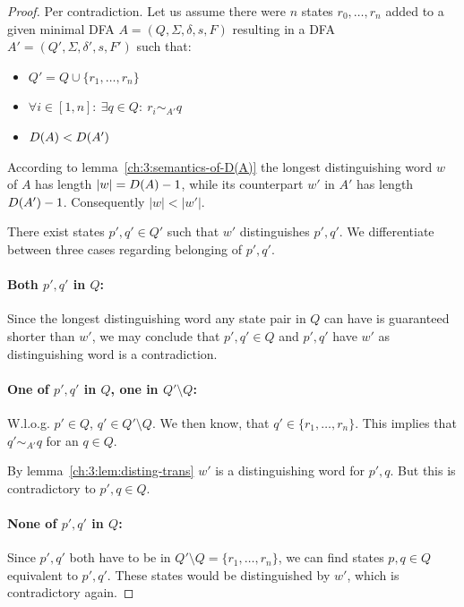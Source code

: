 \begin{proof}
	Per contradiction. Let us assume there were $n$ states $r_0, \ldots, r_n$ added to a given minimal DFA $A = (Q, \Sigma, \delta, s, F)$ resulting in a DFA $A' = (Q', \Sigma, \delta', s, F')$ such that:
	\begin{itemize}
		\item $Q' = Q \cup \{ r_1, \ldots, r_n \}$
		\item $\forall i \in [1,n] \colon\ \exists q \in Q\colon\ r_i \sim_{A'} q$
        \item $D(A) < D(A')$
	\end{itemize}
    According to lemma~\ref{ch:3:semantics-of-D(A)} the longest distinguishing word $w$ of $A$ has length $|w| = D(A) - 1$, while its counterpart $w'$ in $A'$ has length $D(A') - 1$. Consequently $|w| < |w'|$.
    
    There exist states $p',q' \in Q'$ such that $w'$ distinguishes $p',q'$. We differentiate between three cases regarding belonging of $p',q'$.
    
    \paragraph*{Both $p',q'$ in $Q$:} Since the longest distinguishing word any state pair in $Q$ can have is guaranteed shorter than $w'$, we may conclude that $p',q' \in Q$ and $p',q'$ have $w'$ as distinguishing word is a contradiction. \lightning
    
    \paragraph*{One of $p',q'$ in $Q$, one in $Q'\setminus Q$:} W.l.o.g. $p' \in Q$, $q' \in Q'\setminus Q$. We then know, that $q' \in \{r_1, \ldots, r_n\}$. This implies that $q' \sim_{A'} q$ for an $q \in Q$.
    
    By lemma~\ref{ch:3:lem:disting-trans} $w'$ is a distinguishing word for $p',q$. But this is contradictory to $p',q \in Q$. \lightning
        
    \paragraph*{None of $p',q'$ in $Q$:} Since $p',q'$ both have to be in $Q'\setminus Q = \{r_1, \ldots, r_n\}$, we can find states $p, q \in Q$ equivalent to $p',q'$. These states would be distinguished by $w'$, which is contradictory again. \lightning 
\end{proof}

